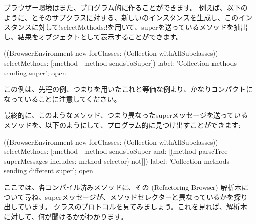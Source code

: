 \documentclass[a4paper,10pt,twoside]{book}
\begin{document}
ブラウザー環境はまた、プログラム的に作ることができます。
例えば、以下のように、とそのサブクラスに対する、新しいのインスタンスを生成し、このインスタンスに対して\ct!selectMethods:!を用いて、superを送っているメソッドを抽出し、結果をオブジェクトとして表示することができます。
\begin{code}{}
((BrowserEnvironment new forClasses: (Collection withAllSubclasses))
	selectMethods: [:method | method sendsToSuper])
	label: 'Collection methods sending super';
	open.
\end{code}{}

この例は、先程の例、つまりを用いたこれと等価な例より、かなりコンパクトになっていることに注意してください。

最終的に、このようなメソッド、つまり異なったsuperメッセージを送っているメソッドを、以下のようにして、プログラム的に見つけ出すことができます:
\begin{code}{}
((BrowserEnvironment new forClasses: (Collection withAllSubclasses))
	selectMethods: [:method | 
		method sendsToSuper
		and: [(method parseTree superMessages includes: method selector) not]])
	label: 'Collection methods sending different super';
	open
\end{code}
ここでは、各コンパイル済みメソッドに、その (Refactoring Browser) 解析木について尋ね、superメッセージが、メソッドセレクターと異なっているかを探り出しています。
クラスのプロトコルを見てみましょう。これを見れば、解析木に対して、何が聞けるかがわかります。%

\end{document}

